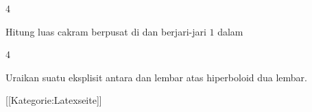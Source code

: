 {4}
{

Hitung luas cakram berpusat di
 dan berjari-jari $1$ dalam

}
{} {}

{4}
{

Uraikan suatu
eksplisit antara
dan lembar atas hiperboloid dua lembar.

}
{} {}

 [[Kategorie:Latexseite]]
